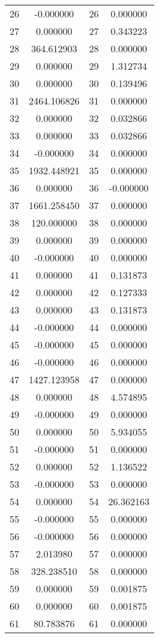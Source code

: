 \documentclass[12pt]{article}
\begin{document}
\begin{longtable}{@{}cccc@{}}
26 & -0.000000 & 26 & 0.000000 \\
27 & 0.000000 & 27 & 0.343223 \\
28 & 364.612903 & 28 & 0.000000 \\
29 & 0.000000 & 29 & 1.312734 \\
30 & 0.000000 & 30 & 0.139496 \\
31 & 2464.106826 & 31 & 0.000000 \\
32 & 0.000000 & 32 & 0.032866 \\
33 & 0.000000 & 33 & 0.032866 \\
34 & -0.000000 & 34 & 0.000000 \\
35 & 1932.448921 & 35 & 0.000000 \\
36 & 0.000000 & 36 & -0.000000 \\
37 & 1661.258450 & 37 & 0.000000 \\
38 & 120.000000 & 38 & 0.000000 \\
39 & 0.000000 & 39 & 0.000000 \\
40 & -0.000000 & 40 & 0.000000 \\
41 & 0.000000 & 41 & 0.131873 \\
42 & 0.000000 & 42 & 0.127333 \\
43 & 0.000000 & 43 & 0.131873 \\
44 & -0.000000 & 44 & 0.000000 \\
45 & -0.000000 & 45 & 0.000000 \\
46 & -0.000000 & 46 & 0.000000 \\
47 & 1427.123958 & 47 & 0.000000 \\
48 & 0.000000 & 48 & 4.574895 \\
49 & -0.000000 & 49 & 0.000000 \\
50 & 0.000000 & 50 & 5.934055 \\
51 & -0.000000 & 51 & 0.000000 \\
52 & 0.000000 & 52 & 1.136522 \\
53 & -0.000000 & 53 & 0.000000 \\
54 & 0.000000 & 54 & 26.362163 \\
55 & -0.000000 & 55 & 0.000000 \\
56 & -0.000000 & 56 & 0.000000 \\
57 & 2.013980 & 57 & 0.000000 \\
58 & 328.238510 & 58 & 0.000000 \\
59 & 0.000000 & 59 & 0.001875 \\
60 & 0.000000 & 60 & 0.001875 \\
61 & 80.783876 & 61 & 0.000000 \\

\end{longtable}
\end{document}
